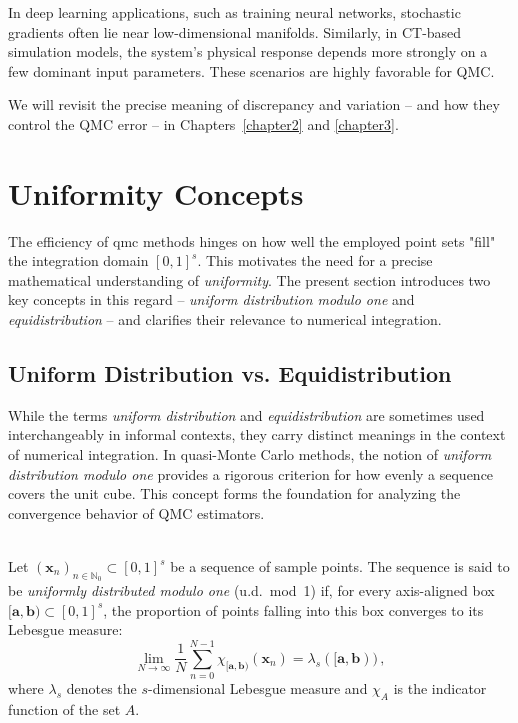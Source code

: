 \begin{example}
In deep learning applications, such as training neural networks, stochastic
gradients often lie near low-dimensional manifolds. Similarly, in CT-based
simulation models, the system's physical response depends more strongly on a few
dominant input parameters. These scenarios are highly favorable for QMC.
\end{example}

We will revisit the precise meaning of discrepancy and variation -- and how they
control the QMC error -- in Chapters~\ref{chapter2} and \ref{chapter3}.


\section{Uniformity Concepts}
\label{sec:uniformity-concepts}

The efficiency of \ac{qmc} methods hinges on how well the employed point sets
"fill" the integration domain $[0,1]^s$. This motivates the need for a precise
mathematical understanding of \emph{uniformity}. The present section introduces
two key concepts in this regard -- \emph{uniform distribution modulo one} and
\emph{equidistribution} -- and clarifies their relevance to numerical
integration.

\subsection{Uniform Distribution vs. Equidistribution}

While the terms \emph{uniform distribution} and \emph{equidistribution} are
sometimes used interchangeably in informal contexts, they carry distinct
meanings in the context of numerical integration. In quasi-Monte Carlo methods,
the notion of \emph{uniform distribution modulo one} provides a rigorous
criterion for how evenly a sequence covers the unit cube. This concept forms the
foundation for analyzing the convergence behavior of QMC estimators.

\begin{definition} \ \\
Let $(\boldsymbol{x}_n)_{n \in \mathbb{N}_0} \subset [0,1]^s$ be a sequence of
sample points. The sequence is said to be \emph{uniformly distributed modulo
one} (u.d.\ mod~1) if, for every axis-aligned box $[\boldsymbol{a},
\boldsymbol{b}) \subset [0,1]^s$, the proportion of points falling into this box
converges to its Lebesgue measure:
\begin{equation*}
    \lim_{N \to \infty} \frac{1}{N} \sum_{n=0}^{N-1} \chi_{[\boldsymbol{a}, \boldsymbol{b})}(\boldsymbol{x}_n)
    = \lambda_s([\boldsymbol{a}, \boldsymbol{b})) \,,
\end{equation*}
where $\lambda_s$ denotes the $s$-dimensional Lebesgue measure and $\chi_A$ is
the indicator function of the set $A$.
\end{definition}

